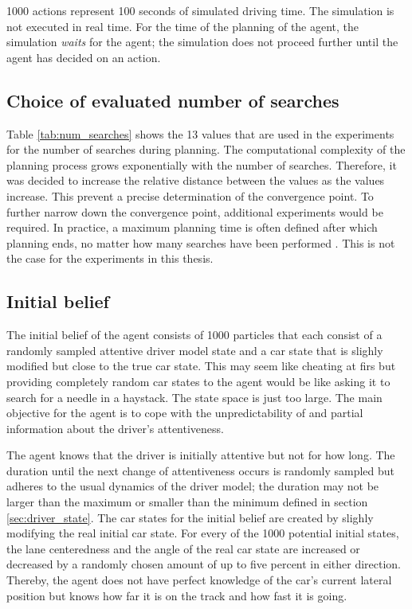 1000 actions represent 100 seconds of simulated driving time. The simulation is not executed in real time. For the time of the planning of the agent, the simulation \emph{waits} for the agent; the simulation does not proceed further until the agent has decided on an action. 

\subsection{Choice of evaluated number of searches}



Table \ref{tab:num_searches} shows the 13 values that are used in the experiments for the number of searches during planning. The computational complexity of the planning process grows exponentially with the number of searches. Therefore, it was decided to increase the relative distance between the values as the values increase. This prevent a precise determination of the convergence point. To further narrow down the convergence point, additional experiments would be required. In practice, a maximum planning time is often defined after which planning ends, no matter how many searches have been performed \parencite{pomcp}. This is not the case for the experiments in this thesis.

\subsection{Initial belief}

The initial belief of the agent consists of 1000 particles that each consist of a randomly sampled attentive driver model state and a car state that is slighly modified but close to the true car state. This may seem like cheating at firs but providing completely random car states to the agent would be like asking it to search for a needle in a haystack. The state space is just too large. The main objective for the agent is to cope with the unpredictability of and partial information about the driver's attentiveness.

The agent knows that the driver is initially attentive but not for how long. The duration until the next change of attentiveness occurs is randomly sampled but adheres to the usual dynamics of the driver model; the duration may not be larger than the maximum or smaller than the minimum defined in section \ref{sec:driver_state}. The car states for the initial belief are created by slighly modifying the real initial car state. For every of the 1000 potential initial states, the lane centeredness and the angle of the real car state are increased or decreased by a randomly chosen amount of up to five percent in either direction. Thereby, the agent does not have perfect knowledge of the car's current lateral position but knows how far it is on the track and how fast it is going.

